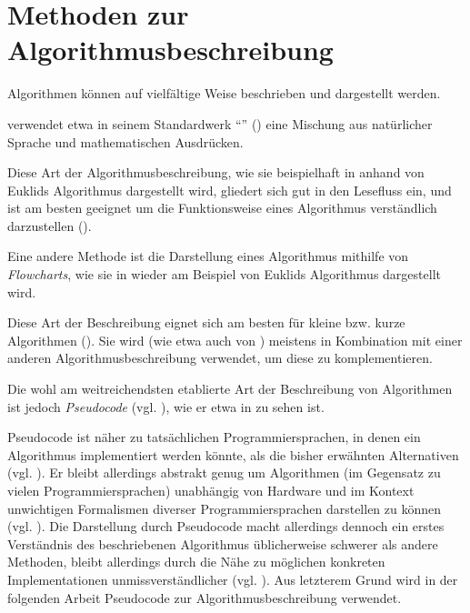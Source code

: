 \section{Methoden zur Algorithmusbeschreibung}
\label{sec:algorithm-specification-overview}

Algorithmen können auf vielfältige Weise beschrieben und dargestellt werden.

\citeauthor{taocp1} verwendet etwa in seinem Standardwerk \enquote{} (\cite{taocp1}) eine Mischung aus natürlicher Sprache und mathematischen Ausdrücken. 



Diese Art der Algorithmusbeschreibung, wie sie beispielhaft in  anhand von Euklids Algorithmus dargestellt wird, gliedert sich gut in den Lesefluss ein, und ist am besten geeignet um die Funktionsweise eines Algorithmus verständlich darzustellen (\cite[147]{zob2015}).

Eine andere Methode ist die Darstellung eines Algorithmus mithilfe von \emph{Flowcharts}, wie sie in  wieder am Beispiel von Euklids Algorithmus dargestellt wird.



Diese Art der Beschreibung eignet sich am besten für kleine bzw. kurze Algorithmen (\cite[5]{hsr1997}). Sie wird (wie etwa auch von \citeauthor{taocp1}) meistens in Kombination mit einer anderen Algorithmusbeschreibung verwendet, um diese zu komplementieren.

Die wohl am weitreichendsten etablierte Art der Beschreibung von Algorithmen ist jedoch \emph{Pseudocode} (vgl. \cite[147]{zob2015}), wie er etwa in  zu sehen ist.



Pseudocode ist näher zu tatsächlichen Programmiersprachen, in denen ein Algorithmus implementiert werden könnte, als die bisher erwähnten Alternativen (vgl. \cite[1]{ofn2015}). Er bleibt allerdings abstrakt genug um Algorithmen (im Gegensatz zu vielen Programmiersprachen) unabhängig von Hardware und im Kontext unwichtigen Formalismen diverser Programmiersprachen darstellen zu können (vgl. \cite[1]{bem1958}). Die Darstellung durch Pseudocode macht allerdings dennoch ein erstes Verständnis des beschriebenen Algorithmus üblicherweise schwerer als andere Methoden, bleibt allerdings durch die Nähe zu möglichen konkreten Implementationen unmissverständlicher (vgl. \cite[147]{zob2015}). Aus letzterem Grund wird in der folgenden Arbeit Pseudocode zur Algorithmusbeschreibung verwendet.

